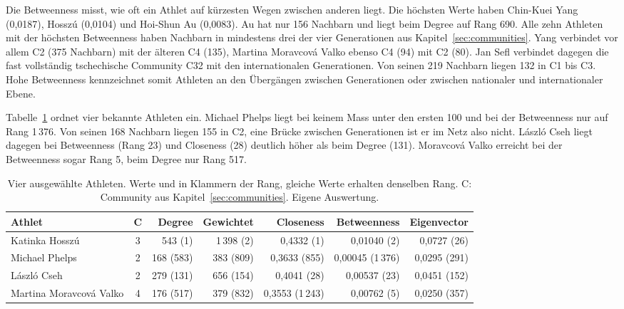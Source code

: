 Die Betweenness misst, wie oft ein Athlet auf kürzesten Wegen zwischen
anderen liegt. Die höchsten Werte haben Chin-Kuei Yang (0,0187), Hosszú
(0,0104) und Hoi-Shun Au (0,0083). Au hat nur 156 Nachbarn und liegt beim
Degree auf Rang 690. Alle zehn Athleten mit der höchsten Betweenness haben
Nachbarn in mindestens drei der vier Generationen aus
Kapitel~\ref{sec:communities}. Yang verbindet vor allem C2 (375 Nachbarn)
mit der älteren C4 (135), Martina Moravcová Valko ebenso C4 (94) mit C2
(80). Jan Sefl verbindet dagegen die fast vollständig tschechische
Community C32 mit den internationalen Generationen. Von seinen 219 Nachbarn
liegen 132 in C1 bis C3. Hohe Betweenness kennzeichnet somit Athleten an
den Übergängen zwischen Generationen oder zwischen nationaler und
internationaler Ebene.

Tabelle~\ref{tab:zentralitaet_beispiele} ordnet vier bekannte Athleten ein.
Michael Phelps liegt bei keinem Mass unter den ersten 100 und bei der
Betweenness nur auf Rang 1\,376. Von seinen 168 Nachbarn liegen 155 in C2,
eine Brücke zwischen Generationen ist er im Netz also nicht. László Cseh
liegt dagegen bei Betweenness (Rang 23) und Closeness (28) deutlich höher
als beim Degree (131). Moravcová Valko erreicht bei der Betweenness sogar
Rang 5, beim Degree nur Rang 517.

\begin{table}[H]
  \centering
  \caption{Vier ausgewählte Athleten. Werte und in Klammern der Rang, gleiche
  Werte erhalten denselben Rang. C: Community aus Kapitel~\ref{sec:communities}.
  Eigene Auswertung.}
  \label{tab:zentralitaet_beispiele}
  \small
  \setlength{\tabcolsep}{2.5pt}
  \begin{tabular}{@{}lcrrrrr@{}}
    \toprule
    Athlet & C & Degree & Gewichtet & Closeness & Betweenness & Eigenvector \\
    \midrule
    Katinka Hosszú & 3 & 543 (1) & 1\,398 (2) & 0,4332 (1) & 0,01040 (2) & 0,0727 (26) \\
    Michael Phelps & 2 & 168 (583) & 383 (809) & 0,3633 (855) & 0,00045 (1\,376) & 0,0295 (291) \\
    László Cseh & 2 & 279 (131) & 656 (154) & 0,4041 (28) & 0,00537 (23) & 0,0451 (152) \\
    Martina Moravcová Valko & 4 & 176 (517) & 379 (832) & 0,3553 (1\,243) & 0,00762 (5) & 0,0250 (357) \\
    \bottomrule
  \end{tabular}
\end{table}

